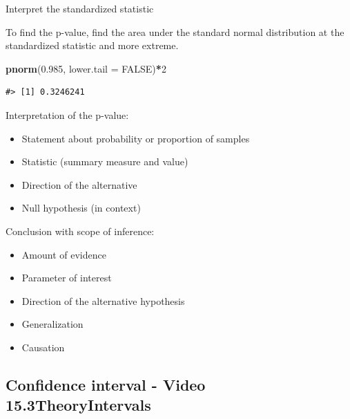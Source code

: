 \documentclass[
]{report}
\newenvironment{Shaded}{\begin{snugshade}}{\end{snugshade}}
\newcommand{\AttributeTok}[1]{\textcolor[rgb]{0.13,0.29,0.53}{#1}}
\newcommand{\ConstantTok}[1]{\textcolor[rgb]{0.56,0.35,0.01}{#1}}
\newcommand{\DecValTok}[1]{\textcolor[rgb]{0.00,0.00,0.81}{#1}}
\newcommand{\FloatTok}[1]{\textcolor[rgb]{0.00,0.00,0.81}{#1}}
\newcommand{\FunctionTok}[1]{\textcolor[rgb]{0.13,0.29,0.53}{\textbf{#1}}}
\newcommand{\NormalTok}[1]{#1}
\newcommand{\SpecialCharTok}[1]{\textcolor[rgb]{0.81,0.36,0.00}{\textbf{#1}}}
\begin{document}
Interpret the standardized statistic

\vspace{0.5in}

\newpage

To find the p-value, find the area under the standard normal distribution at the standardized statistic and more extreme.

\begin{Shaded}
\begin{Highlighting}[]
\FunctionTok{pnorm}\NormalTok{(}\FloatTok{0.985}\NormalTok{, }\AttributeTok{lower.tail =} \ConstantTok{FALSE}\NormalTok{)}\SpecialCharTok{*}\DecValTok{2}
\end{Highlighting}
\end{Shaded}

\begin{verbatim}
#> [1] 0.3246241
\end{verbatim}

Interpretation of the p-value:

\begin{itemize}
\item
  Statement about probability or proportion of samples
\item
  Statistic (summary measure and value)
\item
  Direction of the alternative
\item
  Null hypothesis (in context)
\end{itemize}

\vspace{0.8in}

Conclusion with scope of inference:

\begin{itemize}
\item
  Amount of evidence
\item
  Parameter of interest
\item
  Direction of the alternative hypothesis
\item
  Generalization
\item
  Causation
\end{itemize}

\vspace{0.6in}

\subsection*{Confidence interval - Video 15.3TheoryIntervals}\label{confidence-interval---video-15.3theoryintervals}
\end{document}
